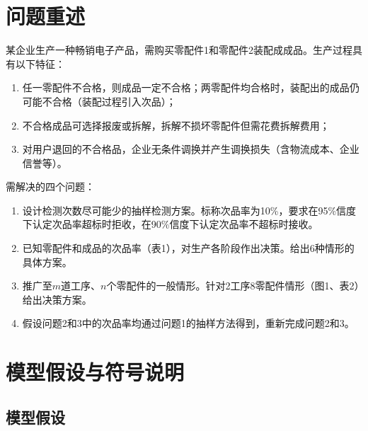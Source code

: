 \documentclass[12pt,a4paper]{ctexart}
\begin{document}
\newpage
\tableofcontents
\newpage

\section{问题重述}

某企业生产一种畅销电子产品，需购买零配件1和零配件2装配成成品。生产过程具有以下特征：
\begin{enumerate}[label=(\arabic*)]
    \item 任一零配件不合格，则成品一定不合格；两零配件均合格时，装配出的成品仍可能不合格（装配过程引入次品）；
    \item 不合格成品可选择报废或拆解，拆解不损坏零配件但需花费拆解费用；
    \item 对用户退回的不合格品，企业无条件调换并产生调换损失（含物流成本、企业信誉等）。
\end{enumerate}

需解决的四个问题：
\begin{enumerate}[label=\textbf{问题\arabic*：},leftmargin=*]
    \item 设计检测次数尽可能少的抽样检测方案。标称次品率为10\%，要求在95\%信度下认定次品率超标时拒收，在90\%信度下认定次品率不超标时接收。
    \item 已知零配件和成品的次品率（表1），对生产各阶段作出决策。给出6种情形的具体方案。
    \item 推广至$m$道工序、$n$个零配件的一般情形。针对2工序8零配件情形（图1、表2）给出决策方案。
    \item 假设问题2和3中的次品率均通过问题1的抽样方法得到，重新完成问题2和3。
\end{enumerate}

\section{模型假设与符号说明}

\subsection{模型假设}
\end{document}

